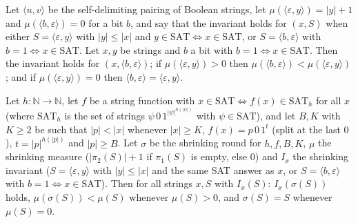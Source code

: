 \begin{theorem}
\label{Complexity.ladner_shrink_terminal_result}
\leanok
{}
Let $\langle u,v\rangle$ be the self-delimiting pairing of Boolean strings, let
$\mu(\langle\varepsilon,y\rangle)=|y|+1$ and $\mu(\langle b,\varepsilon\rangle)=0$ for a bit
$b$, and say that the invariant holds for $(x,S)$ when either $S=\langle\varepsilon,y\rangle$
with $|y|\le|x|$ and $y\in\mathrm{SAT}\iff x\in\mathrm{SAT}$, or $S=\langle b,\varepsilon\rangle$
with $b=1\iff x\in\mathrm{SAT}$. Let $x,y$ be strings and $b$ a bit with
$b=1\iff x\in\mathrm{SAT}$. Then the invariant holds for $(x,\langle b,\varepsilon\rangle)$;
if $\mu(\langle\varepsilon,y\rangle)>0$ then $\mu(\langle b,\varepsilon\rangle)<
\mu(\langle\varepsilon,y\rangle)$; and if $\mu(\langle\varepsilon,y\rangle)=0$ then
$\langle b,\varepsilon\rangle=\langle\varepsilon,y\rangle$.
\end{theorem}

\begin{theorem}
\label{Complexity.ladner_shrink_progress}
\leanok
{}
Let $h:\mathbb N\to\mathbb N$, let $f$ be a string function with
$x\in\mathrm{SAT}\iff f(x)\in\mathrm{SAT}_h$ for all $x$ (where $\mathrm{SAT}_h$ is the set of
strings $\psi\,0\,1^{|\psi|^{h(|\psi|)}}$ with $\psi\in\mathrm{SAT}$), and let $B,K$ with
$K\ge 2$ be such that $|p|<|x|$ whenever $|x|\ge K$, $f(x)=p\,0\,1^t$ (split at the last $0$),
$t=|p|^{h(|p|)}$ and $|p|\ge B$. Let $\sigma$ be the shrinking round for $h,f,B,K$, $\mu$ the
shrinking measure ($|\pi_2(S)|+1$ if $\pi_1(S)$ is empty, else $0$) and $I_x$ the shrinking
invariant ($S=\langle\varepsilon,y\rangle$ with $|y|\le|x|$ and the same SAT answer as $x$,
or $S=\langle b,\varepsilon\rangle$ with $b=1\iff x\in\mathrm{SAT}$). Then for all strings
$x,S$ with $I_x(S)$: $I_x(\sigma(S))$ holds, $\mu(\sigma(S))<\mu(S)$ whenever $\mu(S)>0$, and
$\sigma(S)=S$ whenever $\mu(S)=0$.
\end{theorem}

